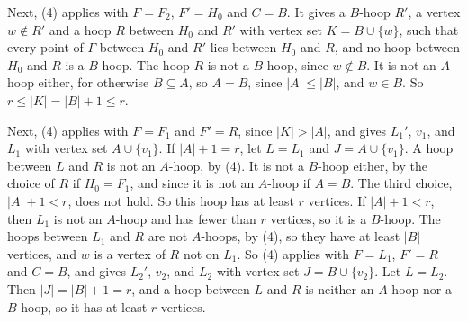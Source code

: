 {Next, (4) applies with $F = F_2$, $F' = H_0$ and $C = B$. It gives a $B$-hoop $R'$, a vertex $w \notin R'$ and a hoop $R$ between $H_0$ and $R'$ with vertex set $K = B \cup \{w\}$, such that every point of $\Gamma$ between $H_0$ and $R'$ lies between $H_0$ and $R$, and no hoop between $H_0$ and $R$ is a $B$-hoop. The hoop $R$ is not a $B$-hoop, since $w \notin B$. It is not an $A$-hoop either, for otherwise $B \subseteq A$, so $A = B$, since $|A| \le |B|$, and $w \in B$. So $r \le |K| = |B| + 1 \le r$.

Next, (4) applies with $F = F_1$ and $F' = R$, since $|K| > |A|$, and gives $L_1'$, $v_1$, and $L_1$ with vertex set $A \cup \{v_1\}$. If $|A| + 1 = r$, let $L = L_1$ and $J = A \cup \{v_1\}$. A hoop between $L$ and $R$ is not an $A$-hoop, by (4). It is not a $B$-hoop either, by the choice of $R$ if $H_0 = F_1$, and since it is not an $A$-hoop if $A = B$. The third choice, $|A| + 1 < r$, does not hold. So this hoop has at least $r$ vertices. If $|A| + 1 < r$, then $L_1$ is not an $A$-hoop and has fewer than $r$ vertices, so it is a $B$-hoop. The hoops between $L_1$ and $R$ are not $A$-hoops, by (4), so they have at least $|B|$ vertices, and $w$ is a vertex of $R$ not on $L_1$. So (4) applies with $F = L_1$, $F' = R$ and $C = B$, and gives $L_2'$, $v_2$, and $L_2$ with vertex set $J = B \cup \{v_2\}$. Let $L = L_2$. Then $|J| = |B| + 1 = r$, and a hoop between $L$ and $R$ is neither an $A$-hoop nor a $B$-hoop, so it has at least $r$ vertices.

}
